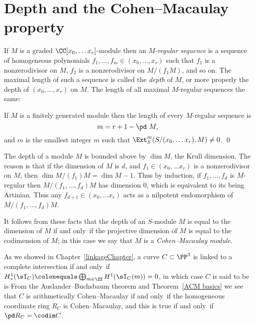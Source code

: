 \section{Depth and the Cohen--Macaulay property}

If $M$ is a graded  $\CC[x_0, \dots x_r]$-module then an \emph{$M$-regular
sequence} is a sequence of homogeneous polynomials
$f_1,\dots,f_m \in (x_0,\dots, x_r)$ such that $f_1$ is a nonzerodivisor
on $M$, $f_2$ is a nonzerodivisor on $M/(f_1M)$, and so on.
The maximal length of such a sequence is called the \emph{depth} of $M$,
%
or more properly the depth of $(x_0,\dots, x_r)$ on $M$.
The length of
all maximal $M$-regular sequences
%
the same:

\begin{theorem}\label{Auslander--Buchsbaum}
If $M$ is a finitely generated module
then the length of every $M$-regular sequence is
$$m = r+1 - \pd\  M,$$
and $m$ is the smallest integer $m$ such that
$\Ext_S^m(S/(x_0, \dots x_r), M) \neq 0$.
%
\qed
\end{theorem}

The depth of a module $M$ is bounded above by $\dim M$, the Krull
dimension. The reason is that if the dimension of $M$
is $d$, and $f_1 \in (x_0, \dots x_r) $ is a nonzerodivisor on $M$,
then $\dim M/(f_1)M= \dim M-1$. Thus by induction, if
$f_1,\dots, f_d$ is $M$-regular then $M/(f_1, \dots, f_d)M$ has
dimension 0, which is equivalent to its being Artinian. Thus any
$ f_{d+1} \in(x_0, \dots x_r) $ acts as a nilpotent endomorphism of
$M/(f_1, \dots, f_d)M$.

It follows from these facts that the depth of an $S$-module $M$ is equal
to the dimension of $M$ if and only~if the projective dimension
of $M$ is equal to the codimension of $M$; in this case we say that $M$
is a
%
\emph{Cohen--Macaulay module}.

As we showed in Chapter~\ref{linkageChapter}, a curve $C\subset \PP^3$
is linked to a complete intersection
if and only~if
$H^1_*(\sI_C) \colonequals  \bigoplus_{m\in \ZZ} H^1(\sI_C(m)) = 0$,
in which case $C$ is said to be is
%
From the
Auslander--Buchsbaum theorem
%
and Theorem~\ref{ACM basics} we
see that $C$ is arithmetically Cohen--Macaulay if
and only~if the homogeneous coordinate ring $R_C$ is Cohen--Macaulay,
and this is true
if and only~if $\pd R_C = \codim C$.

